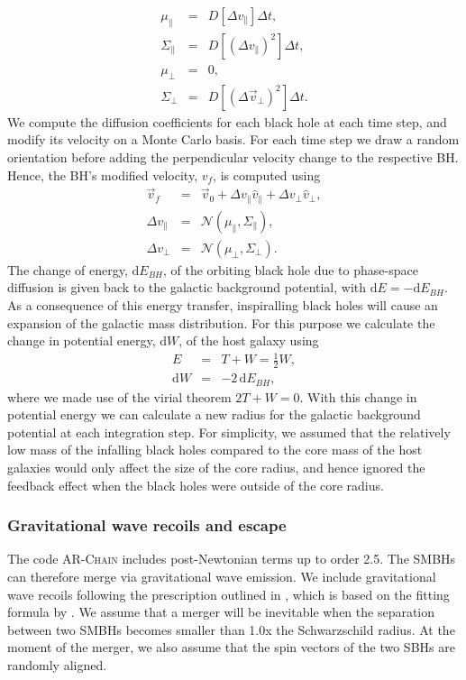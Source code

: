 \documentclass[fleqn,usenatbib,useAMS]{mnras}
\begin{document}
\begin{eqnarray}
\mu_\parallel &=& D[\Delta v_\parallel]\Delta t,\\
\Sigma_\parallel &=& D[(\Delta v_\parallel)^2]\Delta t,\\
\mu_\bot &=& 0,\\
\Sigma_\bot &=& D[(\Delta \vec{v}_\bot)^2]\Delta t.
\end{eqnarray}
We compute the diffusion coefficients for each black hole at each time step, and modify its velocity on a Monte Carlo basis. For each time step we draw a random orientation before adding the perpendicular velocity change to the respective BH. Hence, the BH's modified velocity, $v_f$, is computed using
\begin{eqnarray}
\vec{v}_f &=& \vec{v}_0 + \Delta v_\parallel \hat{v}_\parallel + \Delta v_\bot \hat{v}_\bot,\\
\Delta v_\parallel &=& \mathcal{N}(\mu_\parallel, \Sigma_\parallel),\\
\Delta v_\bot &=& \mathcal{N}(\mu_\bot, \Sigma_\bot).
\end{eqnarray}
The change of energy, $\mbox{d}E_{BH}$, of the orbiting black hole due to phase-space diffusion is given back to the galactic background potential, with $\mbox{d}E = -\mbox{d}E_{BH}$. As a consequence of this energy transfer, inspiralling black holes will cause an expansion of the galactic mass distribution. For this purpose we calculate the change in potential energy, $\mbox{d}W$, of the host galaxy using
\begin{eqnarray}
E &=& T + W = \frac{1}{2}W,\\
\mbox{d}W &=& -2\,\mbox{d}E_{BH},
\end{eqnarray}
where we made use of the virial theorem $2T+W =0$. With this change in potential energy we can calculate a new radius for the galactic background potential at each integration step. For simplicity, we assumed that the relatively low mass of the infalling black holes compared to the core mass of the host galaxies would only affect the size of the core radius, and hence ignored the feedback effect when the black holes were outside of the core radius.

\subsubsection{Gravitational wave recoils and escape}
The code \textsc{AR-Chain} includes post-Newtonian terms up to order 2.5. The SMBHs can therefore merge via gravitational wave emission. We include gravitational wave recoils following the prescription outlined in \citet{2015ApJ...799..178K}, which is based on the fitting formula by \citet{2012PhRvD..85h4015L}.  We assume that a merger will be inevitable when the separation between two SMBHs becomes smaller than 1.0x the Schwarzschild radius. At the moment of the merger, we also assume that the spin vectors of the two SBHs are randomly aligned.
\end{document}
